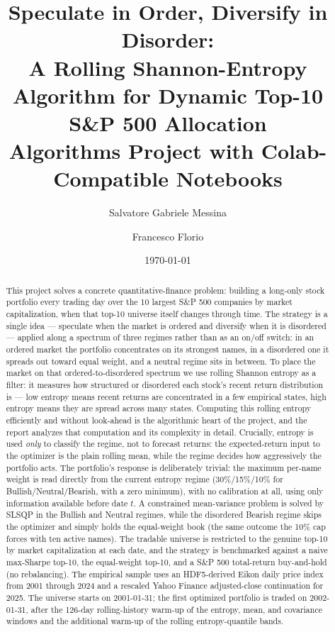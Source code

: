 \documentclass[a4paper,12pt]{article}
\title{\textbf{Speculate in Order, Diversify in Disorder:}\\
\textbf{A Rolling Shannon-Entropy Algorithm for Dynamic Top-10 S\&P 500 Allocation}\\[0.4em]
\large Algorithms Project with Colab-Compatible Notebooks}
\author{Salvatore Gabriele Messina \and Francesco Florio}
\date{\today}
\begin{document}
\maketitle
\thispagestyle{empty}

\begin{abstract}
This project solves a concrete quantitative-finance problem: building a long-only stock portfolio every trading day over the 10 largest S\&P 500 companies by market capitalization, when that top-10 universe itself changes through time. The strategy is a single idea --- speculate when the market is ordered and diversify when it is disordered --- applied along a spectrum of three regimes rather than as an on/off switch: in an ordered market the portfolio concentrates on its strongest names, in a disordered one it spreads out toward equal weight, and a neutral regime sits in between. To place the market on that ordered-to-disordered spectrum we use rolling Shannon entropy as a filter: it measures how structured or disordered each stock's recent return distribution is --- low entropy means recent returns are concentrated in a few empirical states, high entropy means they are spread across many states. Computing this rolling entropy efficiently and without look-ahead is the algorithmic heart of the project, and the report analyzes that computation and its complexity in detail. Crucially, entropy is used \emph{only} to classify the regime, not to forecast returns: the expected-return input to the optimizer is the plain rolling mean, while the regime decides how aggressively the portfolio acts. The portfolio's response is deliberately trivial: the maximum per-name weight is read directly from the current entropy regime (30\%/15\%/10\% for Bullish/Neutral/Bearish, with a zero minimum), with no calibration at all, using only information available before date $t$. A constrained mean-variance problem is solved by SLSQP in the Bullish and Neutral regimes, while the disordered Bearish regime skips the optimizer and simply holds the equal-weight book (the same outcome the 10\% cap forces with ten active names). The tradable universe is restricted to the genuine top-10 by market capitalization at each date, and the strategy is benchmarked against a naive max-Sharpe top-10, the equal-weight top-10, and a S\&P 500 total-return buy-and-hold (no rebalancing). The empirical sample uses an HDF5-derived Eikon daily price index from 2001 through 2024 and a rescaled Yahoo Finance adjusted-close continuation for 2025. The universe starts on 2001-01-31; the first optimized portfolio is traded on 2002-01-31, after the 126-day rolling-history warm-up of the entropy, mean, and covariance windows and the additional warm-up of the rolling entropy-quantile bands.
\end{abstract}
\end{document}
